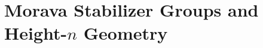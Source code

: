 \section{Morava Stabilizer Groups and Height-$n$ Geometry}\label{sec:chromatic-geometry-stabilizers}
